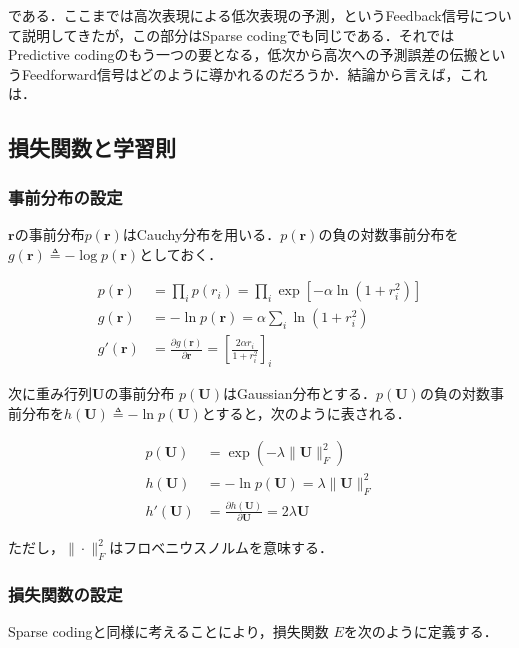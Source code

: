 である．ここまでは高次表現による低次表現の予測，というFeedback信号について説明してきたが，この部分はSparse codingでも同じである．それではPredictive codingのもう一つの要となる，低次から高次への予測誤差の伝搬というFeedforward信号はどのように導かれるのだろうか．結論から言えば，これは\textbf{}．
\subsection{損失関数と学習則}
\subsubsection{事前分布の設定}
$\mathbf{r}$の事前分布$p(\mathbf{r})$はCauchy分布を用いる．$p(\mathbf{r})$の負の対数事前分布を$g(\mathbf{r})\triangleq-\log p(\mathbf{r})$としておく．


\begin{align}
p(\mathbf{r})&=\prod_i p(r_i)=\prod_i \exp\left[-\alpha \ln(1+r_i^2)\right]\\
g(\mathbf{r})&=-\ln p(\mathbf{r})=\alpha \sum_i \ln(1+r_i^2)\\
g'(\mathbf{r})&=\frac{\partial g(\mathbf{r})}{\partial \mathbf{r}}=\left[\frac{2\alpha r_i}{1+r_i^2}\right]_i
\end{align}


次に重み行列$\mathbf{U}$の事前分布 $p(\mathbf{U})$はGaussian分布とする．$p(\mathbf{U})$の負の対数事前分布を$h(\mathbf{U})\triangleq-\ln p(\mathbf{U})$とすると，次のように表される．


\begin{align}
p(\mathbf{U})&=\exp(-\lambda\|\mathbf{U}\|^2_F)\\
h(\mathbf{U})&=-\ln p(\mathbf{U})=\lambda\|\mathbf{U}\|^2_F\\
h'(\mathbf{U})&=\frac{\partial h(\mathbf{U})}{\partial \mathbf{U}}=2\lambda \mathbf{U}
\end{align}


ただし，$\|\cdot \| _ F^2$はフロベニウスノルムを意味する．

\subsubsection{損失関数の設定}
Sparse codingと同様に考えることにより，損失関数 $E$を次のように定義する．


